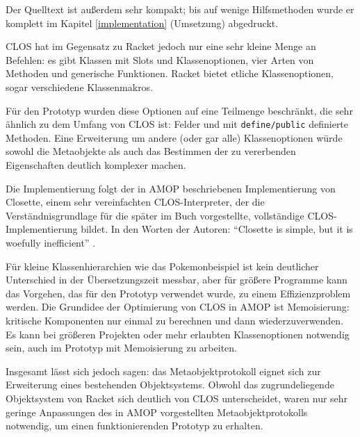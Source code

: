 Der Quelltext ist außerdem sehr kompakt; bis auf wenige Hilfsmethoden wurde er komplett im Kapitel \ref{implementation} (Umsetzung) abgedruckt.

CLOS hat im Gegensatz zu Racket jedoch nur eine sehr kleine Menge an Befehlen: es gibt Klassen mit Slots und Klassenoptionen, vier Arten von Methoden und generische Funktionen. Racket bietet etliche Klassenoptionen, sogar verschiedene Klassenmakros.

Für den Prototyp wurden diese Optionen auf eine Teilmenge beschränkt, die sehr ähnlich zu dem Umfang von CLOS ist: Felder und mit \texttt{define/public} definierte Methoden. Eine Erweiterung um andere (oder gar alle) Klassenoptionen würde sowohl die Metaobjekte als auch das Bestimmen der zu vererbenden Eigenschaften deutlich komplexer machen. 

Die Implementierung folgt der in AMOP beschriebenen Implementierung von Closette, einem sehr vereinfachten CLOS-Interpreter, der die Verständnisgrundlage für die später im Buch vorgestellte, vollständige CLOS-Implementierung bildet. In den Worten der Autoren: ``Closette is simple, but it is woefully inefficient'' \cite[S.45]{amop}. 

Für kleine Klassenhierarchien wie das Pokemonbeispiel ist kein deutlicher Unterschied in der Übersetzungszeit messbar, aber für größere Programme kann das Vorgehen, das für den Prototyp verwendet wurde, zu einem Effizienzproblem werden. Die Grundidee der Optimierung von CLOS in AMOP ist Memoisierung: kritische Komponenten nur einmal zu berechnen und dann wiederzuverwenden. Es kann bei größeren Projekten oder mehr erlaubten Klassenoptionen notwendig sein, auch im Prototyp mit Memoisierung zu arbeiten.

Insgesamt lässt sich jedoch sagen: das Metaobjektprotokoll eignet sich zur Erweiterung eines bestehenden Objektsystems. Obwohl das zugrundeliegende Objektsystem von Racket sich deutlich von CLOS unterscheidet, waren nur sehr geringe Anpassungen des in AMOP vorgestellten Metaobjektprotokolls notwendig, um einen funktionierenden Prototyp zu erhalten.